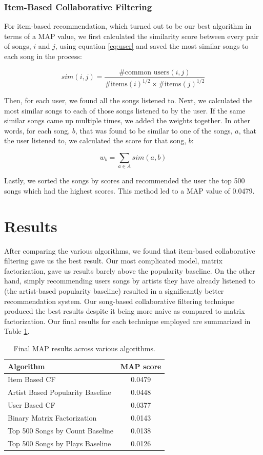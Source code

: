 \documentclass[11pt,preprint]{aastex}
\begin{document}
\subsubsection{Item-Based Collaborative Filtering}
For item-based recommendation, which turned out to be our best algorithm in terms of a MAP value, we first calculated the similarity score between every pair of songs, $i$ and $j$, using equation \ref{eq:user} and saved the most similar songs to each song in the process:

\begin{equation}
sim(i,j) = \frac{\text{\# common users}(i, j)}{{\text{\# items}(i)}^{1/2} \times {\text{\# items}(j)}^{1/2}}
\label{eq:user}
\end{equation}

Then, for each user, we found all the songs listened to. Next, we calculated the most similar songs to each of those songs listened to by the user. If the same similar songs came up multiple times, we added the weights together. In other words, for each song, $b$, that was found to be similar to one of the songs, $a$, that the user listened to, we calculated the score for that song, $b$:

$$w_b = \sum_{a \in A} sim(a, b)$$

Lastly, we sorted the songs by scores and recommended the user the top 500 songs which had the highest scores. This method led to a MAP value of 0.0479.


\section{Results}
After comparing the various algorithms, we found that item-based collaborative filtering gave us the best result. Our most complicated model, matrix factorization, gave us results barely above the popularity baseline. On the other hand, simply recommending users songs by artists they have already listened to (the artist-based popularity baseline) resulted in a significantly better recommendation system. Our song-based collaborative filtering technique produced the best results despite it being more naive as compared to matrix factorization. Our final results for each technique employed are summarized in Table \ref{tab:map}. 

\begin{table}[h]
\begin{center}
\begin{tabular}{lc}
\hline
\bf{Algorithm} &  \bf{MAP score}\\ \hline
Item Based  CF  &  0.0479 \\ 
Artist Based Popularity Baseline  & 0.0448    \\ 
User Based  CF  &  0.0377 \\ 
Binary Matrix Factorization  &   0.0143  \\ 
Top 500 Songs by Count  Baseline &  0.0138  \\ 
Top 500 Songs by Plays  Baseline &  0.0126  \\ 
\end{tabular}
\caption{Final MAP results across various algorithms.}\label{tab:map}
\end{center}
\end{table}
\end{document}

